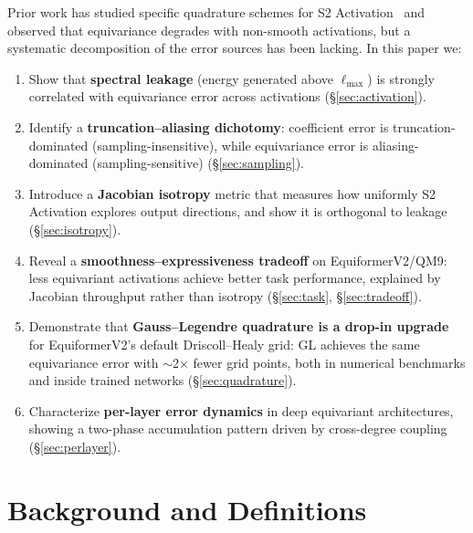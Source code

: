 \documentclass[10pt,twocolumn]{article}
\begin{document}
Prior work has studied specific quadrature schemes for S2 Activation~\citep{e3nn} and
observed that equivariance degrades with non-smooth activations, but a systematic
decomposition of the error sources has been lacking. In this paper we:
\begin{enumerate}
  \item Show that \textbf{spectral leakage} (energy generated above $\ell_{\max}$) is
    strongly correlated with equivariance error across activations (\S\ref{sec:activation}).
  \item Identify a \textbf{truncation--aliasing dichotomy}: coefficient error is
    truncation-dominated (sampling-insensitive), while equivariance error is
    aliasing-dominated (sampling-sensitive) (\S\ref{sec:sampling}).
  \item Introduce a \textbf{Jacobian isotropy} metric that measures how uniformly
    S2 Activation explores output directions, and show it is orthogonal to leakage
    (\S\ref{sec:isotropy}).
  \item Reveal a \textbf{smoothness--expressiveness tradeoff} on EquiformerV2/QM9:
    less equivariant activations achieve better task performance, explained by Jacobian
    throughput rather than isotropy (\S\ref{sec:task}, \S\ref{sec:tradeoff}).
  \item Demonstrate that \textbf{Gauss--Legendre quadrature is a drop-in upgrade} for
    EquiformerV2's default Driscoll--Healy grid: GL achieves the same equivariance
    error with $\sim$2$\times$ fewer grid points, both in numerical benchmarks and
    inside trained networks (\S\ref{sec:quadrature}).
  \item Characterize \textbf{per-layer error dynamics} in deep equivariant architectures,
    showing a two-phase accumulation pattern driven by cross-degree coupling
    (\S\ref{sec:perlayer}).
\end{enumerate}

\section{Background and Definitions}
\label{sec:background}
\end{document}
